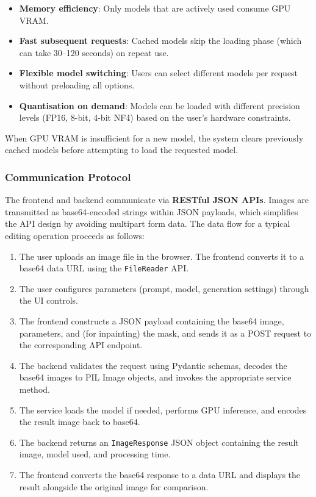 \documentclass[12pt,a4paper]{report}
\begin{document}
\begin{itemize}
    \item \textbf{Memory efficiency}: Only models that are actively used consume GPU VRAM.
    \item \textbf{Fast subsequent requests}: Cached models skip the loading phase (which can take 30--120 seconds) on repeat use.
    \item \textbf{Flexible model switching}: Users can select different models per request without preloading all options.
    \item \textbf{Quantisation on demand}: Models can be loaded with different precision levels (FP16, 8-bit, 4-bit NF4) based on the user's hardware constraints.
\end{itemize}

When GPU VRAM is insufficient for a new model, the system clears previously cached models before attempting to load the requested model.

\subsubsection{Communication Protocol}

The frontend and backend communicate via \textbf{RESTful JSON APIs}. Images are transmitted as base64-encoded strings within JSON payloads, which simplifies the API design by avoiding multipart form data. The data flow for a typical editing operation proceeds as follows:

\begin{enumerate}
    \item The user uploads an image file in the browser. The frontend converts it to a base64 data URL using the \texttt{FileReader} API.
    \item The user configures parameters (prompt, model, generation settings) through the UI controls.
    \item The frontend constructs a JSON payload containing the base64 image, parameters, and (for inpainting) the mask, and sends it as a POST request to the corresponding API endpoint.
    \item The backend validates the request using Pydantic schemas, decodes the base64 images to PIL Image objects, and invokes the appropriate service method.
    \item The service loads the model if needed, performs GPU inference, and encodes the result image back to base64.
    \item The backend returns an \texttt{ImageResponse} JSON object containing the result image, model used, and processing time.
    \item The frontend converts the base64 response to a data URL and displays the result alongside the original image for comparison.
\end{enumerate}
\end{document}
